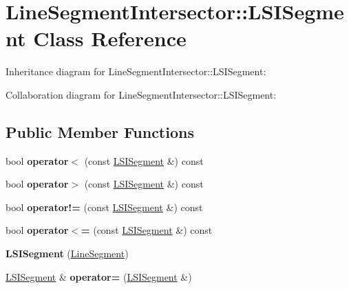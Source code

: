 \hypertarget{classLineSegmentIntersector_1_1LSISegment}{}\section{Line\+Segment\+Intersector\+:\+:L\+S\+I\+Segment Class Reference}
\label{classLineSegmentIntersector_1_1LSISegment}


Inheritance diagram for Line\+Segment\+Intersector\+:\+:L\+S\+I\+Segment\+:


Collaboration diagram for Line\+Segment\+Intersector\+:\+:L\+S\+I\+Segment\+:
\subsection*{Public Member Functions}
\begin{DoxyCompactItemize}
\item 
\mbox{\label{classLineSegmentIntersector_1_1LSISegment_a9849ef126f6018d8ebf789e7c216801d}} 
bool {\bfseries operator$<$} (const \hyperlink{classLineSegmentIntersector_1_1LSISegment}{L\+S\+I\+Segment} \&) const
\item 
\mbox{\label{classLineSegmentIntersector_1_1LSISegment_a46caed8fba72da47df4586d06197b33a}} 
bool {\bfseries operator$>$} (const \hyperlink{classLineSegmentIntersector_1_1LSISegment}{L\+S\+I\+Segment} \&) const
\item 
\mbox{\label{classLineSegmentIntersector_1_1LSISegment_a3771a4e4e29f239f5614909a86df824b}} 
bool {\bfseries operator!=} (const \hyperlink{classLineSegmentIntersector_1_1LSISegment}{L\+S\+I\+Segment} \&) const
\item 
\mbox{\label{classLineSegmentIntersector_1_1LSISegment_a001a3f2f7335f4f979b8d7f680ffbe9e}} 
bool {\bfseries operator$<$=} (const \hyperlink{classLineSegmentIntersector_1_1LSISegment}{L\+S\+I\+Segment} \&) const
\item 
\mbox{\label{classLineSegmentIntersector_1_1LSISegment_a4c6fd956e9c6b9c5cf6f27b9ffc89726}} 
{\bfseries L\+S\+I\+Segment} (\hyperlink{classLineSegment}{Line\+Segment})
\item 
\mbox{\label{classLineSegmentIntersector_1_1LSISegment_a9797f919e76bb5de2ccff9adc651ed91}} 
\hyperlink{classLineSegmentIntersector_1_1LSISegment}{L\+S\+I\+Segment} \& {\bfseries operator=} (\hyperlink{classLineSegmentIntersector_1_1LSISegment}{L\+S\+I\+Segment} \&)
\end{DoxyCompactItemize}
